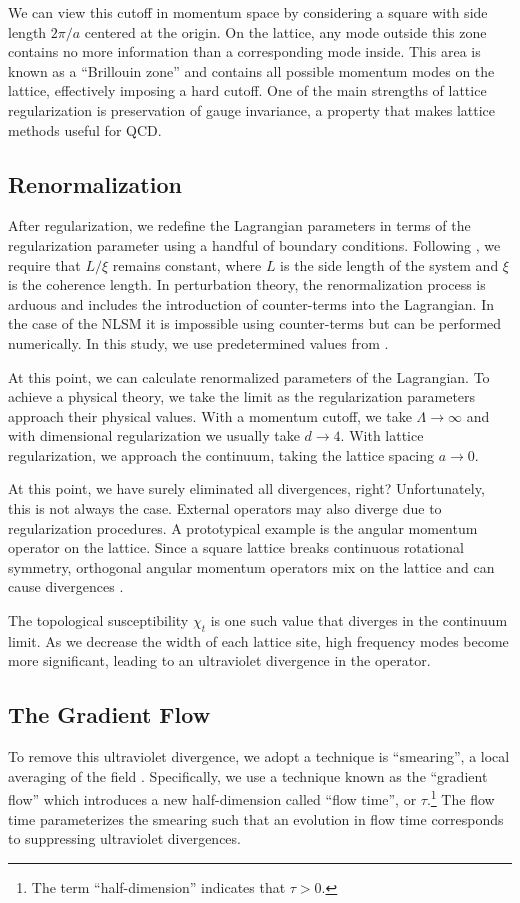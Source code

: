 We can view this cutoff in momentum space by considering a square with side length $2\pi/a$ centered at the origin. On the lattice, any mode outside this zone contains no more information than a corresponding mode inside. This area is known as a ``Brillouin zone'' and contains all possible momentum modes on the lattice, effectively imposing a hard cutoff. One of the main strengths of lattice regularization is preservation of gauge invariance, a property that makes lattice methods useful for QCD.


\subsection{Renormalization}
After regularization, we redefine the Lagrangian parameters in terms of the regularization parameter using a handful of boundary conditions. Following \cite{bietenholz2018}, we require that $L/\xi$ remains constant, where $L$ is the side length of the system and $\xi$ is the coherence length. In perturbation theory, the renormalization process is arduous and includes the introduction of counter-terms into the Lagrangian. In the case of the NLSM it is impossible using counter-terms but can be performed numerically. In this study, we use predetermined values from \cite{bietenholz2018}.

At this point, we can calculate renormalized parameters of the Lagrangian. To achieve a physical theory, we take the limit as the regularization parameters approach their physical values. With a momentum cutoff, we take $\Lambda \rightarrow \infty$ and with dimensional regularization we usually take $d\rightarrow 4$. With lattice regularization, we approach the continuum, taking the lattice spacing $a\rightarrow 0$. 

At this point, we have surely eliminated all divergences, right? Unfortunately, this is not always the case. External operators may also diverge due to regularization procedures. A prototypical example is the angular momentum operator on the lattice. Since a square lattice breaks continuous rotational symmetry, orthogonal angular momentum operators mix on the lattice and can cause divergences \cite{monahan2016}. 

The topological susceptibility $\chi_t$ is one such value that diverges in the continuum limit. As we decrease the width of each lattice site, high frequency modes become more significant, leading to an ultraviolet divergence in the operator. 

\subsection{The Gradient Flow}
\label{sec:gradflow}
To remove this ultraviolet divergence, we adopt a technique is ``smearing'', a local averaging of the field \cite{solbrig2007}. Specifically, we use a technique known as the ``gradient flow'' \cite{monahan2015} which introduces a new half-dimension called ``flow time'', or $\tau$.\footnote{The term ``half-dimension'' indicates that $\tau>0$.}  The flow time parameterizes the smearing such that an evolution in flow time corresponds to suppressing ultraviolet divergences. 

